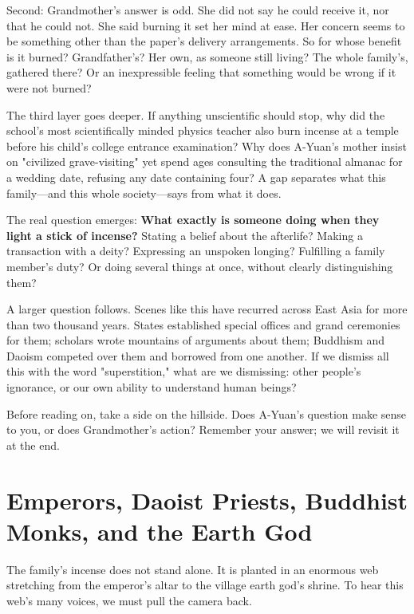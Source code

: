 Second: Grandmother's answer is odd. She did not say he could receive it, nor that he could not. She said burning it set her mind at ease. Her concern seems to be something other than the paper's delivery arrangements. So for whose benefit is it burned? Grandfather's? Her own, as someone still living? The whole family's, gathered there? Or an inexpressible feeling that something would be wrong if it were not burned?

The third layer goes deeper. If anything unscientific should stop, why did the school's most scientifically minded physics teacher also burn incense at a temple before his child's college entrance examination? Why does A-Yuan's mother insist on "civilized grave-visiting" yet spend ages consulting the traditional almanac for a wedding date, refusing any date containing four? A gap separates what this family---and this whole society---says from what it does.

The real question emerges: \textbf{What exactly is someone doing when they light a stick of incense?} Stating a belief about the afterlife? Making a transaction with a deity? Expressing an unspoken longing? Fulfilling a family member's duty? Or doing several things at once, without clearly distinguishing them?

A larger question follows. Scenes like this have recurred across East Asia for more than two thousand years. States established special offices and grand ceremonies for them; scholars wrote mountains of arguments about them; Buddhism and Daoism competed over them and borrowed from one another. If we dismiss all this with the word "superstition," what are we dismissing: other people's ignorance, or our own ability to understand human beings?

Before reading on, take a side on the hillside. Does A-Yuan's question make sense to you, or does Grandmother's action? Remember your answer; we will revisit it at the end.

\section[Emperors, Priests, Monks, and Gods]{Emperors, Daoist Priests, Buddhist Monks, and the Earth God}
The family's incense does not stand alone. It is planted in an enormous web stretching from the emperor's altar to the village earth god's shrine. To hear this web's many voices, we must pull the camera back.

